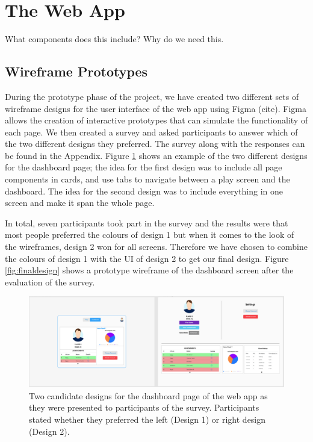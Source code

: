 \documentclass{l4proj}
\begin{document}
\section{The Web App}
What components does this include? Why do we need this.

\subsection{Wireframe Prototypes}
During the prototype phase of the project, we have created two different sets of wireframe designs for the user interface of the web app using Figma (cite). Figma allows the creation of interactive prototypes that can simulate the functionality of each page. We then created a survey and asked participants to answer which of the two different designs they preferred. The survey along with the responses can be found in the Appendix. Figure \ref{fig:wireframe} shows an example of the two different designs for the dashboard page; the idea for the first design was to include all page components in cards, and use tabs to navigate between a play screen and the dashboard. The idea for the second design was to include everything in one screen and make it span the whole page.

In total, seven participants took part in the survey and the results were that most people preferred the colours of design 1 but when it comes to the look of the wireframes, design 2 won for all screens. Therefore we have chosen to combine the colours of design 1 with the UI of design 2 to get our final design. Figure \ref{fig:finaldesign} shows a prototype wireframe of the dashboard screen after the evaluation of the survey.
\begin{figure}
    \centering
    \includegraphics[width=1\linewidth]{images/Dashboard.png}    

    \caption{Two candidate designs for the dashboard page of the web app as they were presented to participants of the survey. Participants stated whether they preferred the left (Design 1) or right design (Design 2). }

    \label{fig:wireframe} 
\end{figure}
\end{document}
